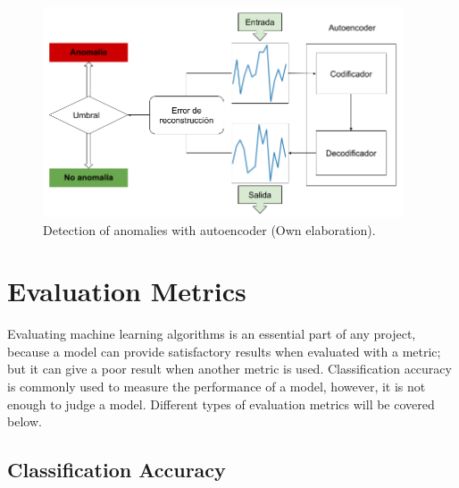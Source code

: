 \begin{figure}[h!]
  \begin{center}	\includegraphics[width=0.95\textwidth, frame]{imagenes/Cap4/autoencoder-anomaly}
  \caption{Detection of anomalies with autoencoder (Own elaboration).} 
  \label{fig:autoencoder-anomaly}
  \end{center}
\end{figure}


\section{Evaluation Metrics}

Evaluating machine learning algorithms is an essential part of any project, because a model can provide satisfactory results when evaluated with a metric; but it can give a poor result when another metric is used. Classification accuracy is commonly used to measure the performance of a model, however, it is not enough to judge a model. Different types of evaluation metrics will be covered below.

\subsection{Classification Accuracy}

